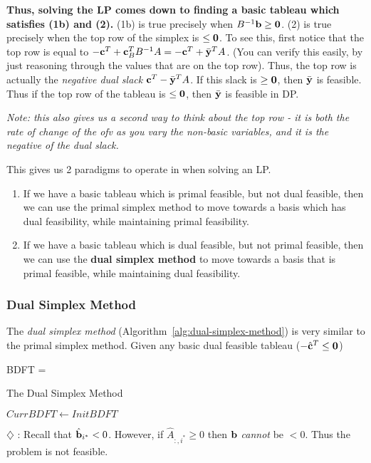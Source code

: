 \textbf{Thus, solving the LP comes down to finding a basic tableau which satisfies 
(1b) and (2).}
(1b) is true precisely when $B^{-1}\mathbf{b} \geq \mathbf{0}$.
(2) is true precisely when the top row of the simplex is 
$\leq \mathbf{0}$. To see this, first notice that the top row is equal to 
$-\mathbf{c}^T + \mathbf{c}_B^TB^{-1}A = -\mathbf{c}^T + \bar{\mathbf{y}}^TA$. (You can verify this 
easily, by just reasoning through the values that are on the top row). Thus,
the top row is actually the \textit{negative dual slack}
$\mathbf{c}^T - \bar{\mathbf{y}}^TA$. If this slack is $\geq \mathbf{0}$, then $\bar{\mathbf{y}}$ is feasible.
Thus if the top row of the tableau is $\leq \mathbf{0}$, then $\bar{\mathbf{y}}$ is 
feasible in DP.

\textit{Note: this also gives us a second way to think about the top row - it is 
both the rate of change of the ofv as you vary the non-basic variables, and it
is the negative of the dual slack.}

This gives us 2 paradigms to operate in when solving an LP.
\begin{enumerate}
	\item
		If we have a basic tableau which is primal feasible, but not dual 
		feasible, then we can use the primal simplex method to move towards
		a basis which has dual feasibility, while maintaining primal 
		feasibility.
	\item
		If we have a basic tableau which is dual feasible, but not primal
		feasible, then we can use the \textbf{dual simplex method} to move
		towards a basis that is primal feasible, while maintaining dual 
		feasibility.
\end{enumerate}

\subsubsection{Dual Simplex Method}

The \textit{dual simplex method} (Algorithm~\ref{alg:dual-simplex-method}) is very similar to the primal simplex method.
Given any basic dual feasible tableau ($-\hat{\mathbf{c}}^T \leq \mathbf{0}$)
\begin{frml}
BDFT =	
\end{frml}

\begin{algorithm}\label{alg:dual-simplex-method}
\caption{The Dual Simplex Method}
	$CurrBDFT \leftarrow InitBDFT$\;
\end{algorithm}

$\diamondsuit$ : Recall that $\hat{\mathbf{b}}_{i^*} < 0$. However, if $\hat A_{:,i^*} \geq 0$
then $\mathbf{b}$  \textit{cannot} be $< 0$. Thus the problem is not feasible.


